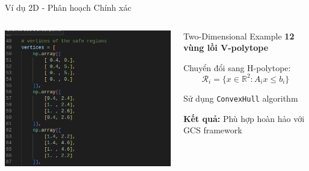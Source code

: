 \documentclass[aspectratio=169]{beamer}
\begin{document}
\begin{frame}{Ví dụ 2D - Phân hoạch Chính xác}
    \begin{columns}[c]
        \includegraphics[width=\textwidth]{imgs/2d-decompose.png}

        \begin{block}{Two-Dimensional Example}
            \small
            \textbf{12 vùng lồi V-polytope}

            \vspace{0.3cm}
            Chuyển đổi sang H-polytope:
            \[
                \mathcal{R}_i = \{x \in \mathbb{R}^2 : A_i x \leq b_i\}
            \]

            \vspace{0.3cm}
            Sử dụng \texttt{ConvexHull} algorithm

            \vspace{0.3cm}
            \textbf{Kết quả:} Phù hợp hoàn hảo với GCS framework
        \end{block}
    \end{columns}
\end{frame}
\end{document}
